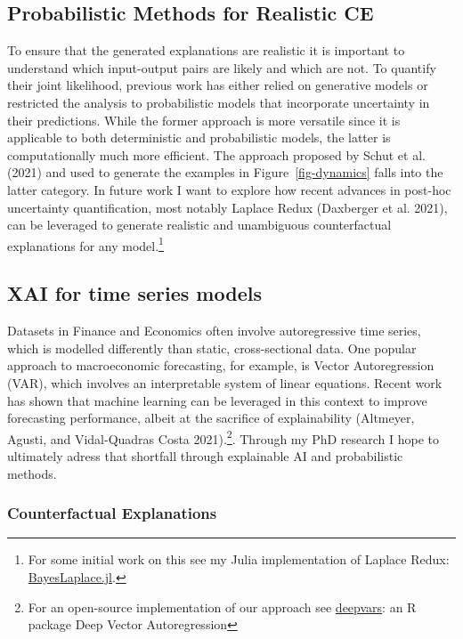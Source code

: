 \documentclass[
]{acmconf}
\begin{document}
\hypertarget{probabilistic-methods-for-realistic-ce}{%
\subsection{Probabilistic Methods for Realistic
CE}\label{probabilistic-methods-for-realistic-ce}}

To ensure that the generated explanations are realistic it is important
to understand which input-output pairs are likely and which are not. To
quantify their joint likelihood, previous work has either relied on
generative models or restricted the analysis to probabilistic models
that incorporate uncertainty in their predictions. While the former
approach is more versatile since it is applicable to both deterministic
and probabilistic models, the latter is computationally much more
efficient. The approach proposed by Schut et al. (2021) and used to
generate the examples in Figure~\ref{fig-dynamics} falls into the latter
category. In future work I want to explore how recent advances in
post-hoc uncertainty quantification, most notably Laplace Redux
(Daxberger et al. 2021), can be leveraged to generate realistic and
unambiguous counterfactual explanations for any model.\footnote{For some
  initial work on this see my Julia implementation of Laplace Redux:
  \href{https://www.paltmeyer.com/BayesLaplace.jl/dev/}{BayesLaplace.jl}.}

\hypertarget{xai-for-time-series-models}{%
\subsection{XAI for time series
models}\label{xai-for-time-series-models}}

Datasets in Finance and Economics often involve autoregressive time
series, which is modelled differently than static, cross-sectional data.
One popular approach to macroeconomic forecasting, for example, is
Vector Autoregression (VAR), which involves an interpretable system of
linear equations. Recent work has shown that machine learning can be
leveraged in this context to improve forecasting performance, albeit at
the sacrifice of explainability (Altmeyer, Agusti, and Vidal-Quadras
Costa 2021).\footnote{For an open-source implementation of our approach
  see \href{https://github.com/pat-alt/deepvars}{deepvars}: an R package
  Deep Vector Autoregression}. Through my PhD research I hope to
ultimately adress that shortfall through explainable AI and
probabilistic methods.

\hypertarget{counterfactual-explanations}{%
\subsubsection{Counterfactual
Explanations}\label{counterfactual-explanations}}
\end{document}
